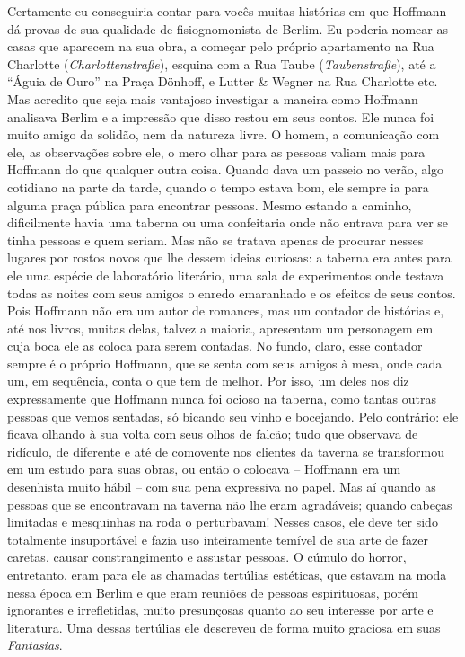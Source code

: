 Certamente eu conseguiria contar para vocês muitas histórias em que
Hoffmann dá provas de sua qualidade de fisiognomonista de Berlim. Eu
poderia nomear as casas que aparecem na sua obra, a começar pelo próprio
apartamento na Rua Charlotte (\emph{Charlottenstraße}), esquina com a
Rua Taube (\emph{Taubenstraße}), até a ``Águia de Ouro'' na Praça
Dönhoff, e Lutter \& Wegner na Rua Charlotte etc. Mas acredito que seja
mais vantajoso investigar a maneira como Hoffmann analisava Berlim e a
impressão que disso restou em seus contos. Ele nunca foi muito amigo da
solidão, nem da natureza livre. O homem, a comunicação com ele, as
observações sobre ele, o mero olhar para as pessoas valiam mais para
Hoffmann do que qualquer outra coisa. Quando dava um passeio no verão,
algo cotidiano na parte da tarde, quando o tempo estava bom, ele sempre
ia para alguma praça pública para encontrar pessoas. Mesmo estando a
caminho, dificilmente havia uma taberna ou uma confeitaria onde não
entrava para ver se tinha pessoas e quem seriam. Mas não se tratava
apenas de procurar nesses lugares por rostos novos que lhe dessem ideias
curiosas: a taberna era antes para ele uma espécie de laboratório
literário, uma sala de experimentos onde testava todas as noites com
seus amigos o enredo emaranhado e os efeitos de seus contos. Pois
Hoffmann não era um autor de romances, mas um contador de histórias e,
até nos livros, muitas delas, talvez a maioria, apresentam um personagem
em cuja boca ele as coloca para serem contadas. No fundo, claro, esse
contador sempre é o próprio Hoffmann, que se senta com seus amigos à
mesa, onde cada um, em sequência, conta o que tem de melhor. Por isso,
um deles nos diz expressamente que Hoffmann nunca foi ocioso na taberna,
como tantas outras pessoas que vemos sentadas, só bicando seu vinho e
bocejando. Pelo contrário: ele ficava olhando à sua volta com seus olhos
de falcão; tudo que observava de ridículo, de diferente e até de
comovente nos clientes da taverna se transformou em um estudo para suas
obras, ou então o colocava -- Hoffmann era um desenhista muito hábil --
com sua pena expressiva no papel. Mas aí quando as pessoas que se
encontravam na taverna não lhe eram agradáveis; quando cabeças limitadas
e mesquinhas na roda o perturbavam! Nesses casos, ele deve ter sido
totalmente insuportável e fazia uso inteiramente temível de sua arte de
fazer caretas, causar constrangimento e assustar pessoas. O cúmulo do
horror, entretanto, eram para ele as chamadas tertúlias estéticas, que
estavam na moda nessa época em Berlim e que eram reuniões de pessoas
espirituosas, porém ignorantes e irrefletidas, muito presunçosas quanto
ao seu interesse por arte e literatura. Uma dessas tertúlias ele
descreveu de forma muito graciosa em suas \emph{Fantasias}.

